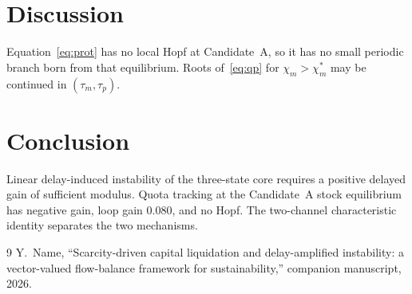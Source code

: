 \documentclass[11pt]{article}
\theoremstyle{definition}
\begin{document}
\section{Discussion}

Equation~\eqref{eq:prot} has no local Hopf at Candidate~A, so it has no small periodic branch born from that equilibrium. Roots of~\eqref{eq:qp} for $\chi_m>\chi_m^*$ may be continued in $(\tau_m,\tau_p)$.

\section{Conclusion}

Linear delay-induced instability of the three-state core requires a positive delayed gain of sufficient modulus. Quota tracking at the Candidate~A stock equilibrium has negative gain, loop gain $0.080$, and no Hopf. The two-channel characteristic identity separates the two mechanisms.

\begin{thebibliography}{9}
Y.\ Name, ``Scarcity-driven capital liquidation and delay-amplified instability: a vector-valued flow-balance framework for sustainability,'' companion manuscript, 2026.
\end{thebibliography}
\end{document}
